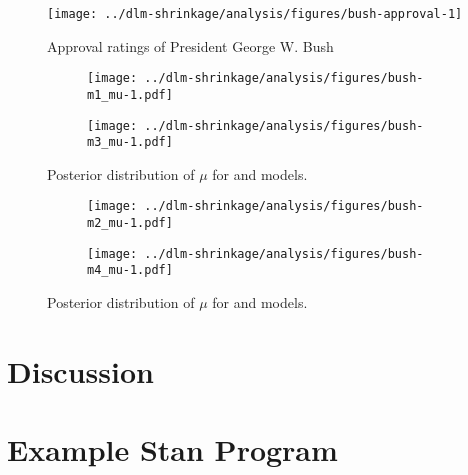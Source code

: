 \begin{figure}[thbp!]
  \centering
  \texttt{[image: ../dlm-shrinkage/analysis/figures/bush-approval-1]}
  \caption{Approval ratings of President George W. Bush}
  \label{dlm:fig:bush_approval}
\end{figure}

\begin{figure}[thbp!]
  \centering
  \begin{subfigure}[b]{\linewidth}
    \texttt{[image: ../dlm-shrinkage/analysis/figures/bush-m1\_mu-1.pdf]}
    \caption{}
  \end{subfigure}

  \begin{subfigure}[b]{\linewidth}
    \texttt{[image: ../dlm-shrinkage/analysis/figures/bush-m3\_mu-1.pdf]}
    \caption{}
  \end{subfigure}
  \caption{Posterior distribution of $\mu$ for  and  models.}
  \label{dlm:fig:bush_mu1}
\end{figure}

\begin{figure}[thbp!]
  \begin{subfigure}[b]{\linewidth}
    \texttt{[image: ../dlm-shrinkage/analysis/figures/bush-m2\_mu-1.pdf]}
    \caption{}
  \end{subfigure}

  \begin{subfigure}[b]{\linewidth}
    \texttt{[image: ../dlm-shrinkage/analysis/figures/bush-m4\_mu-1.pdf]}
    \caption{}
  \end{subfigure}
  \caption{Posterior distribution of $\mu$ for  and  models.}
  \label{dlm:fig:bush_mu2}
\end{figure}


\begin{table}[thbp!]
  \centering
  
  \caption{}
  \label{dlm:tab:bush_model_comp}
\end{table}



\section{Discussion}
\label{dlm:sec:discussion}




\section{Example Stan Program}
\label{dlm:sec:example-stan-program}

